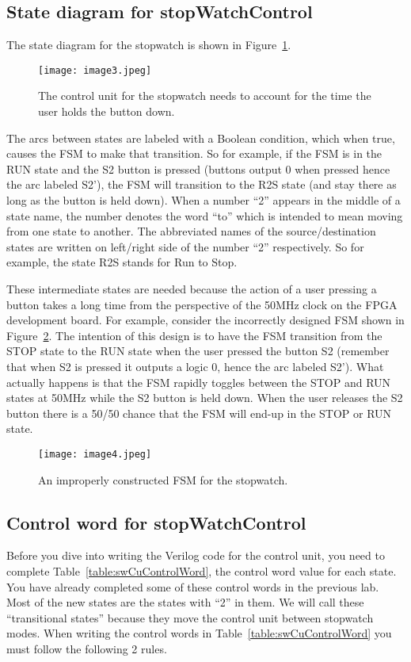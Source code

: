 \subsection{State diagram for stopWatchControl}
The state diagram for the stopwatch is shown in Figure~\ref{fig:swCuStateDiagram}.
\begin{figure}[ht]
\texttt{[image: image3.jpeg]}
\caption{The control unit for the stopwatch needs to account for the
time the user holds the button down.}
\label{fig:swCuStateDiagram}
\end{figure}
The arcs between states are labeled with a Boolean condition, which when
true, causes the FSM to make that transition. So for example, if the FSM
is in the RUN state and the S2 button is pressed (buttons output 0 when
pressed hence the arc labeled S2'), the FSM will transition to the R2S
state (and stay there as long as the button is held down). When a number
``2'' appears in the middle of a state name, the number denotes the word
``to'' which is intended to mean moving from one state to another. The
abbreviated names of the source/destination states are written on
left/right side of the number ``2'' respectively. So for example, the
state R2S stands for Run to Stop.

These intermediate states are needed because the action of a user
pressing a button takes a long time from the perspective of the 50MHz
clock on the FPGA development board. For example, consider the incorrectly designed FSM
shown in Figure~\ref{fig:swCuImproperFsm}. The intention of this design is to have the FSM
transition from the STOP state to the RUN state when the user pressed
the button S2 (remember that when S2 is pressed it outputs a logic 0,
hence the arc labeled S2'). What actually happens is that the FSM
rapidly toggles between the STOP and RUN states at 50MHz while the S2
button is held down. When the user releases the S2 button there is a
50/50 chance that the FSM will end-up in the STOP or RUN state.

\begin{figure}[ht]
\texttt{[image: image4.jpeg]}
\caption{An improperly constructed FSM for the stopwatch.}
\label{fig:swCuImproperFsm}
\end{figure}

\subsection{Control word for stopWatchControl}
Before you dive into writing the Verilog code for the control unit, you
need to complete Table~\ref{table:swCuControlWord}, the control word value for each state. You
have already completed some of these control words in the previous lab.
Most of the new states are the states with ``2'' in them. We will call
these ``transitional states'' because they move the control unit between
stopwatch modes. When writing the control words in Table~\ref{table:swCuControlWord} you must
follow the following 2 rules.

